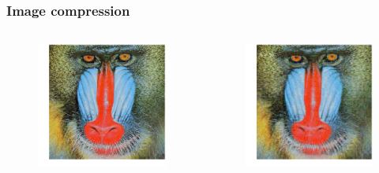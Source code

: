 \documentclass[xcolor={dvipsnames}]{beamer}
\begin{document}
\begin{frame}
\frametitle{Image compression}
\begin{columns}
\hspace{-0.25in}
\begin{figure}
\includegraphics[width=\textwidth]{figs/mandrill.png}
\end{figure}
\begin{figure}
\includegraphics[width=\textwidth]{figs/mandrill-50.png}
\end{figure}
\end{columns}
\end{frame}
\end{document}
